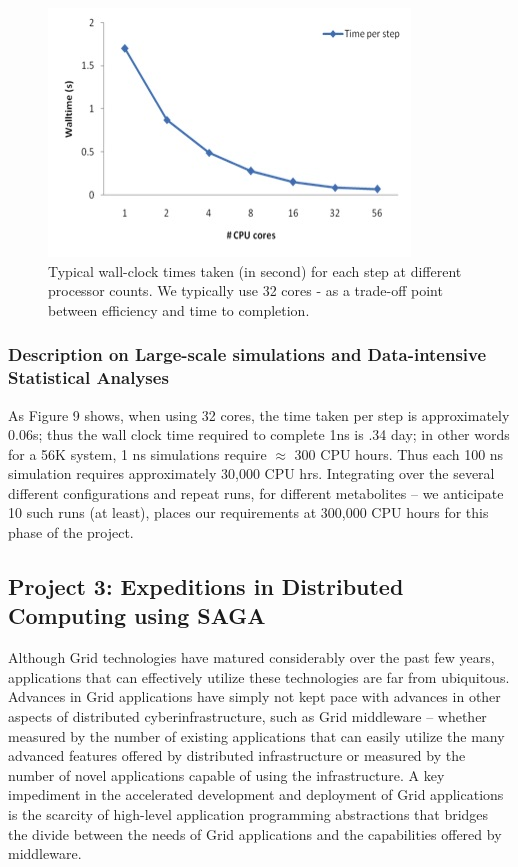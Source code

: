 \documentclass[a4paper,10pt]{article}
\begin{document}
\begin{figure}
   \includegraphics[scale=0.660]{56k_scaling-2}
\caption{Typical wall-clock times taken (in second) for each step at different processor counts. We typically use 32 cores - as a trade-off point between efficiency and time to completion. }
\end{figure}

\subsubsection*{Description on Large-scale simulations and Data-intensive Statistical Analyses}

As Figure 9 shows, when using 32 cores, the time taken per step is approximately 0.06s; thus the 
wall clock time required to complete 1ns  is .34 day; in other words for a 56K system, 1 ns simulations require $\approx$ 300 CPU hours. Thus each 100 ns simulation requires approximately
30,000 CPU hrs. Integrating over the several different  configurations and repeat runs, for different
metabolites -- we anticipate 10 such runs (at least), places our requirements at 300,000 CPU hours
for this phase of the project. 


\subsection*{Project 3: Expeditions in Distributed Computing using SAGA}

Although Grid technologies have matured considerably over the past few years, applications that can 
effectively utilize these technologies are far from ubiquitous.  Advances in Grid applications have simply 
not kept pace with advances in other aspects of distributed cyberinfrastructure, such as Grid middleware -- 
whether measured by the number of existing applications that can easily utilize the many advanced 
features offered by distributed infrastructure or measured by the number of novel applications capable of 
using the infrastructure. A key impediment in the accelerated development and deployment of Grid 
applications is the scarcity of high-level application programming abstractions that bridges the divide 
between the needs of Grid applications and the capabilities offered by middleware.
\end{document}
